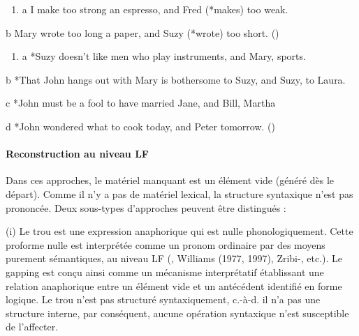 \begin{enumerate}
\item a   I make too strong an espresso, and Fred (*makes) too weak.  


\end{enumerate}
  b  Mary wrote too long a paper, and Suzy (*wrote) too short.     (\citet{Coppock2001})


\begin{enumerate}
\item a   *Suzy doesn't like men who play instruments, and Mary, sports.  


\end{enumerate}
  b  *That John hangs out with Mary is bothersome to Suzy, and Suzy, to Laura.

  c  *John must be a fool to have married Jane, and Bill, Martha

  d  *John wondered what to cook today, and Peter tomorrow.     (\citet{Coppock2001})

\paragraph[Reconstruction au niveau LF]{Reconstruction au niveau LF}
Dans ces approches, le matériel manquant est un élément vide (généré dès le départ). Comme il n'y a pas de matériel lexical, la structure syntaxique n'est pas prononcée. Deux sous-types d'approches peuvent être distingués :

(i) Le trou est une expression anaphorique qui est nulle phonologiquement. Cette proforme nulle est interprétée comme un pronom ordinaire par des moyens purement sémantiques, au niveau LF (\citet{Wasow1972}, Williams (1977, 1997), Zribi-\citet{Hertz1986}, etc.). Le gapping est conçu ainsi comme un mécanisme interprétatif établissant une relation anaphorique entre un élément vide et un antécédent identifié en forme logique. Le trou n'est pas structuré syntaxiquement, c.-à-d. il n'a pas une structure interne, par conséquent, aucune opération syntaxique n'est susceptible de l'affecter. 


